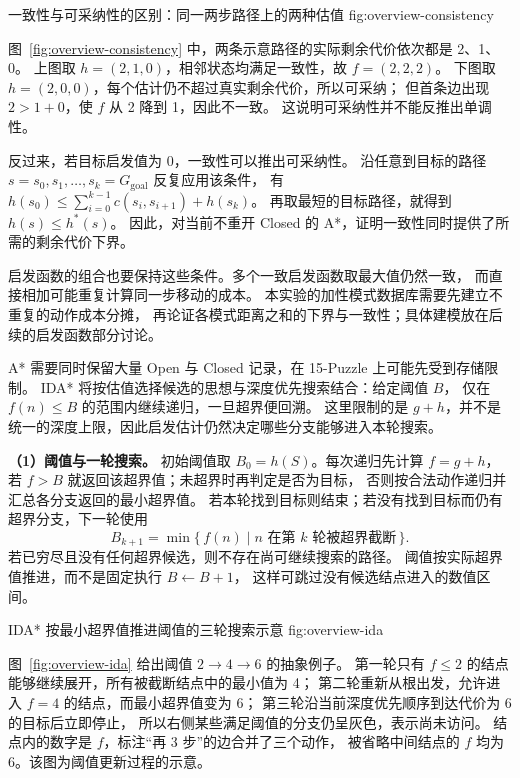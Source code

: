   {一致性与可采纳性的区别：同一两步路径上的两种估值}
  {fig:overview-consistency}

图~\ref{fig:overview-consistency} 中，两条示意路径的实际剩余代价依次都是 2、1、0。
上图取 $h=(2,1,0)$，相邻状态均满足一致性，故 $f=(2,2,2)$。
下图取 $h=(2,0,0)$，每个估计仍不超过真实剩余代价，所以可采纳；
但首条边出现 $2>1+0$，使 $f$ 从 2 降到 1，因此不一致。
这说明可采纳性并不能反推出单调性。

反过来，若目标启发值为 0，一致性可以推出可采纳性。
沿任意到目标的路径 $s=s_0,s_1,\ldots,s_k=G_{\mathrm{goal}}$ 反复应用该条件，
有 $h(s_0)\leq \sum_{i=0}^{k-1}c(s_i,s_{i+1})+h(s_k)$。
再取最短的目标路径，就得到 $h(s)\leq h^*(s)$。
因此，对当前不重开 Closed 的 A*，证明一致性同时提供了所需的剩余代价下界。

启发函数的组合也要保持这些条件。多个一致启发函数取最大值仍然一致，
而直接相加可能重复计算同一步移动的成本。
本实验的加性模式数据库需要先建立不重复的动作成本分摊，
再论证各模式距离之和的下界与一致性；具体建模放在后续的启发函数部分讨论。
\FloatBarrier


A* 需要同时保留大量 Open 与 Closed 记录，在 15-Puzzle 上可能先受到存储限制。
IDA* 将按估值选择候选的思想与深度优先搜索结合：给定阈值 $B$，
仅在 $f(n)\leq B$ 的范围内继续递归，一旦超界便回溯。
这里限制的是 $g+h$，并不是统一的深度上限，因此启发估计仍然决定哪些分支能够进入本轮搜索。

\textbf{（1）阈值与一轮搜索。}
初始阈值取 $B_0=h(S)$。每次递归先计算 $f=g+h$，
若 $f>B$ 就返回该超界值；未超界时再判定是否为目标，
否则按合法动作递归并汇总各分支返回的最小超界值。
若本轮找到目标则结束；若没有找到目标而仍有超界分支，下一轮使用
\begin{equation}
  B_{k+1}=\min\{\,f(n)\mid n\text{ 在第 }k\text{ 轮被超界截断}\,\}.
  \label{eq:overview-bound}
\end{equation}
若已穷尽且没有任何超界候选，则不存在尚可继续搜索的路径。
阈值按实际超界值推进，而不是固定执行 $B\leftarrow B+1$，
这样可跳过没有候选结点进入的数值区间。

  {IDA* 按最小超界值推进阈值的三轮搜索示意}
  {fig:overview-ida}

图~\ref{fig:overview-ida} 给出阈值 $2\to4\to6$ 的抽象例子。
第一轮只有 $f\leq2$ 的结点能够继续展开，所有被截断结点中的最小值为 4；
第二轮重新从根出发，允许进入 $f=4$ 的结点，而最小超界值变为 6；
第三轮沿当前深度优先顺序到达代价为 6 的目标后立即停止，
所以右侧某些满足阈值的分支仍呈灰色，表示尚未访问。
结点内的数字是 $f$，标注“再 3 步”的边合并了三个动作，
被省略中间结点的 $f$ 均为 6。该图为阈值更新过程的示意。

